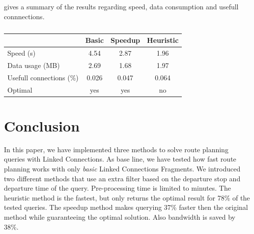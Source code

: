 \documentclass[twocolumn]{phdsymp} %
\begin{document}
 gives a summary of the results regarding speed, data consumption and usefull connnections.
\begin{table}[htbp]
\centering
\begin{tabular}{ | l || c | c | c |}
\hline
  & Basic & Speedup & Heuristic  \\ \hline
  Speed (s) & 4.54 & 2.87 & 1.96 \\
  Data usage (MB) & 2.69 & 1.68 & 1.97 \\
  Usefull connections (\%) & 0.026 & 0.047 & 0.064 \\
  Optimal & yes & yes & no \\
\hline  
\end{tabular}
\caption{}
\label{table:summary}
\end{table}

\section{Conclusion}
In this paper, we have implemented three methods to solve route planning queries with Linked Connections. As base line, we have tested how fast route planning works with only \textit{basic} Linked Connections Fragments. We introduced two different methods that use an extra filter based on the departure stop and departure time of the query. Pre-processing time is limited to minutes. The heuristic method is the fastest, but only returns the optimal result for 78\% of the tested queries. The speedup method makes querying 37\% faster then the original method while guaranteeing the optimal solution. Also bandwidth is saved by 38\%.

\nocite{*}

\end{document}

